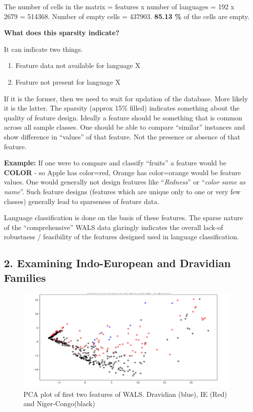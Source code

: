 The number of cells in the matrix = features x number of languages = 192 x 2679 = 514368. Number of empty cells = 437903. \textbf{85.13 \%} of the cells are empty.

\textbf{What does this sparsity indicate?}

It can indicate two things.

\begin{enumerate}[{\rm 1)}]
\itemsep=0pt
\item Feature data not available for language X

 \item Feature not present for language X

\end{enumerate}

If it is the former, then we need to wait for updation of the database. More likely it is the latter. The sparsity (approx 15\% filled) indicates something about the quality of feature design. Ideally a feature should be something that is common across all sample classes. One should be able to compare “similar” instances and show difference in “values” of that feature. Not the presence or absence of that feature.

\begin{myquote}
\textbf{Example:} If one were to compare and classify “fruits” a feature would be \textbf{COLOR} - so Apple has {color=red}, Orange has {color=orange} would be feature values. One would generally not design features like “\textit{Redness}” or “\textit{color same as name}”. Such feature designs (features which are unique only to one or very few classes) generally lead to sparseness of feature data.
\end{myquote}

Language classification is done on the basis of these features. The sparse nature of the “comprehensive” WALS data glaringly indicates the overall lack-of robustness / feasibility of the features designed used in language classification.


\subsection*{2. Examining Indo-European and Dravidian Families}

\begin{figure}[!htbp]
\includegraphics[scale=0.21]{"images/6-03.jpg"}
\caption{PCA plot of first two features of WALS. Dravidian (blue), IE (Red) and Niger-Congo(black)}\label{art6-fig03}
\end{figure}

